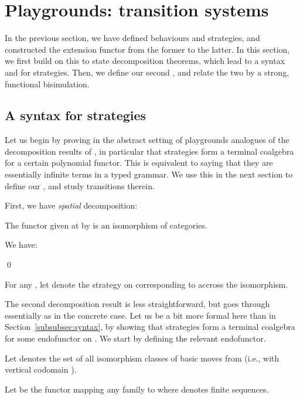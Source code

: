 \documentclass{LMCS}
\theoremstyle{plain}\newtheorem{satz}[thm]{Satz}
\begin{document}
\section{Playgrounds: transition systems}\label{sec:strats}
In the previous section, we have defined behaviours and strategies,
and constructed the extension functor from the former to the latter.
In this section, we first build on this to state decomposition
theorems, which lead to a syntax and \anlts{} for strategies. Then, we
define our second \lts{}, and relate the two by a strong, functional
bisimulation.

\subsection{A syntax for strategies}\label{subsec:syntax:strats}
Let us begin by proving in the abstract setting of playgrounds
analogues of the decomposition results of
, in particular that strategies form a
terminal coalgebra for a certain polynomial functor. This is
equivalent to saying that they are essentially infinite terms in a
typed grammar. We use this in the next section to define our \lts{}
, and study transitions therein.

First, we have \emph{spatial} decomposition:
   \begin{prop}\label{prop:spatial} 
     The functor  given at
      by  is an isomorphism of
     categories.
   \end{prop}
   \proof
     We have:
     \begin{center}
       \qed
     \end{center}
For any , let  denote the strategy on 
     corresponding to  accross the isomorphism.

     The second decomposition result is less straightforward, but goes
     through essentially as in the concrete case. Let us be a bit more
     formal here than in Section~\ref{subsubsec:syntax}, by showing
     that strategies form a terminal coalgebra for some endofunctor on
     .  We start by defining the relevant endofunctor.
     

\begin{defi}
       Let  denotes the set of all isomorphism classes of
       basic moves from  (i.e., with vertical codomain ).
     \end{defi}
     \begin{defi}
       Let  be the functor
       mapping any family  to  where 
       denotes finite sequences.
     \end{defi}
\end{document}
